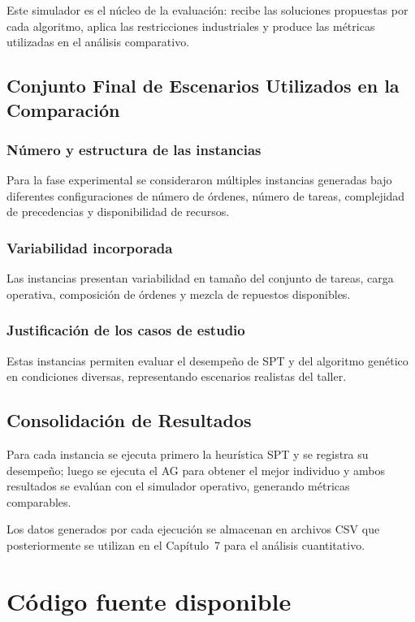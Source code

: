 Este simulador es el núcleo de la evaluación: recibe las soluciones propuestas por cada algoritmo, aplica las restricciones industriales y produce las métricas utilizadas en el análisis comparativo.

\subsection{Conjunto Final de Escenarios Utilizados en la Comparación}

\subsubsection{Número y estructura de las instancias}
Para la fase experimental se consideraron múltiples instancias generadas bajo diferentes configuraciones de número de órdenes, número de tareas, complejidad de precedencias y disponibilidad de recursos.

\subsubsection{Variabilidad incorporada}
Las instancias presentan variabilidad en tamaño del conjunto de tareas, carga operativa, composición de órdenes y mezcla de repuestos disponibles.

\subsubsection{Justificación de los casos de estudio}
Estas instancias permiten evaluar el desempeño de SPT y del algoritmo genético en condiciones diversas, representando escenarios realistas del taller.

\subsection{Consolidación de Resultados}

Para cada instancia se ejecuta primero la heurística SPT y se registra su desempeño; luego se ejecuta el AG para obtener el mejor individuo y ambos resultados se evalúan con el simulador operativo, generando métricas comparables.

Los datos generados por cada ejecución se almacenan en archivos CSV que posteriormente se utilizan en el Capítulo~7 para el análisis cuantitativo.

\section{Código fuente disponible}

